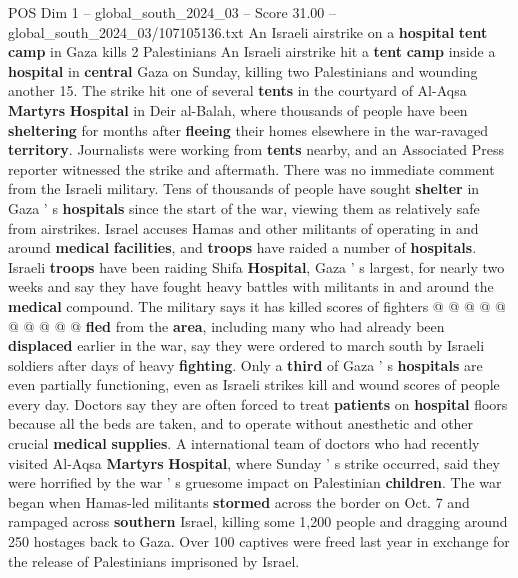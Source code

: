 \begin{textsample}{POS Dim 1 – global\_south\_2024\_03 – Score 31.00 – global\_south\_2024\_03/107105136.txt}  \label{ex:f1_pos_017}
An Israeli airstrike on a \textbf{hospital} \textbf{tent} \textbf{camp} in Gaza kills 2 Palestinians An Israeli airstrike hit a \textbf{tent} \textbf{camp} inside a \textbf{hospital} in \textbf{central} Gaza on Sunday, killing two Palestinians and wounding another 15.
The strike hit one of several \textbf{tents} in the courtyard of Al-Aqsa \textbf{Martyrs} \textbf{Hospital} in Deir al-Balah, where thousands of people have been \textbf{sheltering} for months after \textbf{fleeing} their homes elsewhere in the war-ravaged \textbf{territory}.
Journalists were working from \textbf{tents} nearby, and an Associated Press reporter witnessed the strike and aftermath.
There was no immediate comment from the Israeli military.
Tens of thousands of people have sought \textbf{shelter} in Gaza ' s \textbf{hospitals} since the start of the war, viewing them as relatively safe from airstrikes.
Israel accuses Hamas and other militants of operating in and around \textbf{medical} \textbf{facilities}, and \textbf{troops} have raided a number of \textbf{hospitals}.
Israeli \textbf{troops} have been raiding Shifa \textbf{Hospital}, Gaza ' s largest, for nearly two weeks and say they have fought heavy battles with militants in and around the \textbf{medical} compound.
The military says it has killed scores of fighters @ @ @ @ @ @ @ @ @ @ \textbf{fled} from the \textbf{area}, including many who had already been \textbf{displaced} earlier in the war, say they were ordered to march south by Israeli soldiers after days of heavy \textbf{fighting}.
Only a \textbf{third} of Gaza ' s \textbf{hospitals} are even partially functioning, even as Israeli strikes kill and wound scores of people every day.
Doctors say they are often forced to treat \textbf{patients} on \textbf{hospital} floors because all the beds are taken, and to operate without anesthetic and other crucial \textbf{medical} \textbf{supplies}.
A international team of doctors who had recently visited Al-Aqsa \textbf{Martyrs} \textbf{Hospital}, where Sunday ' s strike occurred, said they were horrified by the war ' s gruesome impact on Palestinian \textbf{children}.
The war began when Hamas-led militants \textbf{stormed} across the border on Oct. 7 and rampaged across \textbf{southern} Israel, killing some 1,200 people and dragging around 250 hostages back to Gaza.
Over 100 captives were freed last year in exchange for the release of Palestinians imprisoned by Israel.

\end{textsample}
